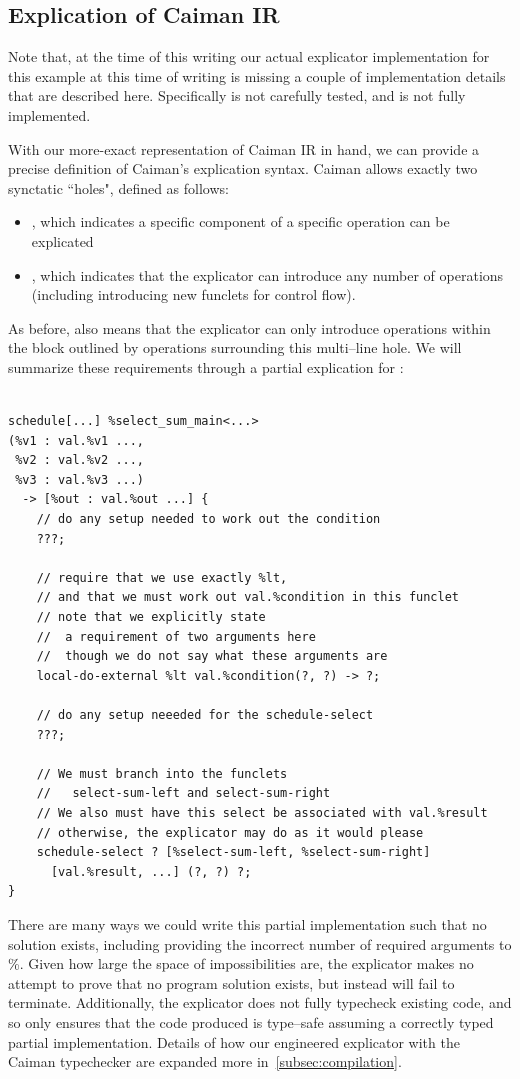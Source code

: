 \subsection{Explication of Caiman IR}

Note that, at the time of this writing our actual explicator implementation for this example at this time of writing is missing a couple of implementation details that are described here.  Specifically  is not carefully tested, and  is not fully implemented.

With our more-exact representation of Caiman IR in hand, we can provide a precise definition of Caiman's explication syntax.  Caiman allows exactly two synctatic ``holes", defined as follows:
%
\begin{itemize}
\item {}, which indicates a specific component of a specific operation can be explicated
\item {}, which indicates that the explicator can introduce any number of operations (including introducing new funclets for control flow).
\end{itemize}
%
As before,  also means that the explicator can only introduce operations within the block outlined by operations surrounding this multi--line hole.  We will summarize these requirements through a partial explication for :
%
\begin{lstlisting}

schedule[...] %select_sum_main<...>
(%v1 : val.%v1 ..., 
 %v2 : val.%v2 ..., 
 %v3 : val.%v3 ...) 
  -> [%out : val.%out ...] {
    // do any setup needed to work out the condition
    ???;
  
    // require that we use exactly %lt, 
    // and that we must work out val.%condition in this funclet
    // note that we explicitly state 
    //  a requirement of two arguments here
    //  though we do not say what these arguments are
    local-do-external %lt val.%condition(?, ?) -> ?;
    
    // do any setup neeeded for the schedule-select
    ???;
    
    // We must branch into the funclets 
    //   select-sum-left and select-sum-right
    // We also must have this select be associated with val.%result
    // otherwise, the explicator may do as it would please
    schedule-select ? [%select-sum-left, %select-sum-right]
      [val.%result, ...] (?, ?) ?;
}
\end{lstlisting}
%
There are many ways we could write this partial implementation such that no solution exists, including providing the incorrect number of required arguments to \%.  Given how large the space of impossibilities are, the explicator makes no attempt to prove that no program solution exists, but instead will fail to terminate.  Additionally, the explicator does not fully typecheck existing code, and so only ensures that the code produced is type--safe assuming a correctly typed partial implementation.  Details of how our engineered explicator with the Caiman typechecker are expanded more in~\ref{subsec:compilation}.

